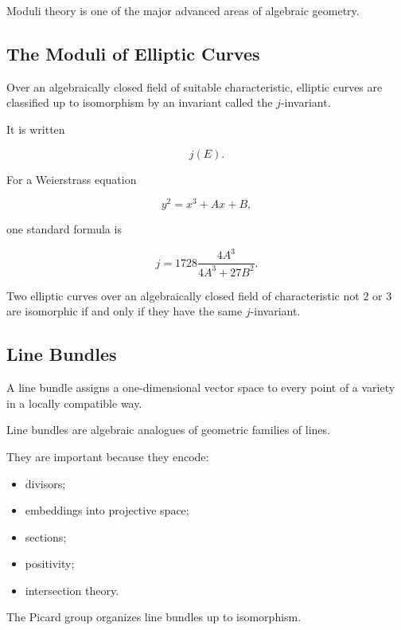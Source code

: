 Moduli theory is one of the major advanced areas of algebraic geometry.

\subsection{The Moduli of Elliptic Curves}
\label{subsec:moduli-elliptic-curves}

Over an algebraically closed field of suitable characteristic, elliptic
curves are classified up to isomorphism by an invariant called the
\(j\)-invariant.

It is written

\[
\boxed{
j(E).
}
\]

For a Weierstrass equation

\[
y^2=x^3+Ax+B,
\]

one standard formula is

\[
\boxed{
j
=
1728
\frac{4A^3}
{4A^3+27B^2}.
}
\]

Two elliptic curves over an algebraically closed field of characteristic not
\(2\) or \(3\) are isomorphic if and only if they have the same
\(j\)-invariant.

\subsection{Line Bundles}
\label{subsec:algebraic-line-bundles}

A line bundle assigns a one-dimensional vector space to every point of a
variety in a locally compatible way.

Line bundles are algebraic analogues of geometric families of lines.

They are important because they encode:

\begin{itemize}
    \item divisors;
    \item embeddings into projective space;
    \item sections;
    \item positivity;
    \item intersection theory.
\end{itemize}

The Picard group organizes line bundles up to isomorphism.

